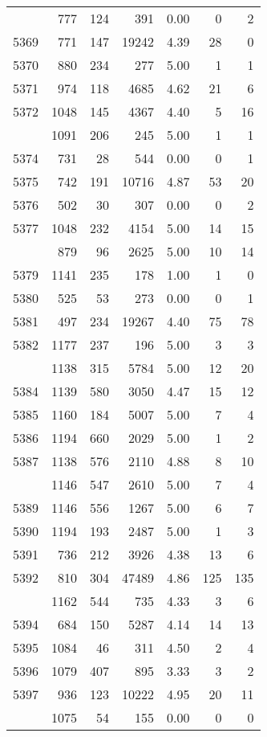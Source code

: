 \documentclass[
]{article}
\begin{document}
\begin{table}
\begin{tabular}[t]{lrrrrrr}
\addlinespace
5368 & 777 & 124 & 391 & 0.00 & 0 & 2\\
5369 & 771 & 147 & 19242 & 4.39 & 28 & 0\\
5370 & 880 & 234 & 277 & 5.00 & 1 & 1\\
5371 & 974 & 118 & 4685 & 4.62 & 21 & 6\\
5372 & 1048 & 145 & 4367 & 4.40 & 5 & 16\\
\addlinespace
5373 & 1091 & 206 & 245 & 5.00 & 1 & 1\\
5374 & 731 & 28 & 544 & 0.00 & 0 & 1\\
5375 & 742 & 191 & 10716 & 4.87 & 53 & 20\\
5376 & 502 & 30 & 307 & 0.00 & 0 & 2\\
5377 & 1048 & 232 & 4154 & 5.00 & 14 & 15\\
\addlinespace
5378 & 879 & 96 & 2625 & 5.00 & 10 & 14\\
5379 & 1141 & 235 & 178 & 1.00 & 1 & 0\\
5380 & 525 & 53 & 273 & 0.00 & 0 & 1\\
5381 & 497 & 234 & 19267 & 4.40 & 75 & 78\\
5382 & 1177 & 237 & 196 & 5.00 & 3 & 3\\
\addlinespace
5383 & 1138 & 315 & 5784 & 5.00 & 12 & 20\\
5384 & 1139 & 580 & 3050 & 4.47 & 15 & 12\\
5385 & 1160 & 184 & 5007 & 5.00 & 7 & 4\\
5386 & 1194 & 660 & 2029 & 5.00 & 1 & 2\\
5387 & 1138 & 576 & 2110 & 4.88 & 8 & 10\\
\addlinespace
5388 & 1146 & 547 & 2610 & 5.00 & 7 & 4\\
5389 & 1146 & 556 & 1267 & 5.00 & 6 & 7\\
5390 & 1194 & 193 & 2487 & 5.00 & 1 & 3\\
5391 & 736 & 212 & 3926 & 4.38 & 13 & 6\\
5392 & 810 & 304 & 47489 & 4.86 & 125 & 135\\
\addlinespace
5393 & 1162 & 544 & 735 & 4.33 & 3 & 6\\
5394 & 684 & 150 & 5287 & 4.14 & 14 & 13\\
5395 & 1084 & 46 & 311 & 4.50 & 2 & 4\\
5396 & 1079 & 407 & 895 & 3.33 & 3 & 2\\
5397 & 936 & 123 & 10222 & 4.95 & 20 & 11\\
\addlinespace
5398 & 1075 & 54 & 155 & 0.00 & 0 & 0\\

\end{tabular}
\end{table}
\end{document}
